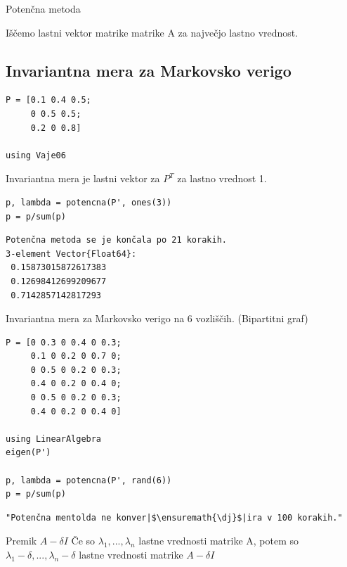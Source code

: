 \documentclass[12pt,a4paper]{article}
\begin{document}
Potenčna metoda


Iščemo lastni vektor matrike matrike A za največjo lastno vrednost.


\subsection{Invariantna mera za Markovsko verigo}

\begin{verbatim}
P = [0.1 0.4 0.5;
     0 0.5 0.5;
     0.2 0 0.8]

using Vaje06
\end{verbatim}

Invariantna mera je lastni vektor za $P^T$ za lastno vrednost 1.


\begin{verbatim}
p, lambda = potencna(P', ones(3))
p = p/sum(p)
\end{verbatim}
\begin{verbatim}
Potenčna metoda se je končala po 21 korakih.
3-element Vector{Float64}:
 0.15873015872617383
 0.12698412699209677
 0.7142857142817293
\end{verbatim}

Invariantna mera za Markovsko verigo na 6 vozliščih. (Bipartitni graf)


\begin{verbatim}
P = [0 0.3 0 0.4 0 0.3;
     0.1 0 0.2 0 0.7 0;
     0 0.5 0 0.2 0 0.3;
     0.4 0 0.2 0 0.4 0;
     0 0.5 0 0.2 0 0.3;
     0.4 0 0.2 0 0.4 0]

using LinearAlgebra
eigen(P')

p, lambda = potencna(P', rand(6))
p = p/sum(p)
\end{verbatim}
\begin{verbatim}
"Potenčna mentolda ne konver|$\ensuremath{\dj}$|ira v 100 korakih."
\end{verbatim}

Premik $A - \ensuremath{\delta}I$ Če so $\ensuremath{\lambda}_1,...,\ensuremath{\lambda}_n$ lastne vrednosti matrike A, potem so $\ensuremath{\lambda}_1-\ensuremath{\delta},...,\ensuremath{\lambda}_n-\ensuremath{\delta}$ lastne vrednosti matrike $A - \ensuremath{\delta}I$
\end{document}
